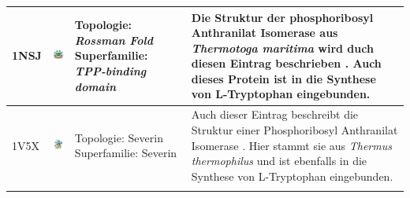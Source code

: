 \documentclass{report}
\begin{document}
\begin{table}
\begin{center}
\begin{tabular}{ | C{9mm} | C{30mm} | C{29mm} | C{38mm} | }
1NSJ  & \includegraphics[width=30mm, trim= -10 -5 -5 -10]{1NSJ_bio_r_500.jpg}  & Topologie: \newline \textit{Rossman Fold} \newline Superfamilie: \newline \textit{TPP-binding domain} & Die Struktur der phosphoribosyl Anthranilat Isomerase aus \textit{Thermotoga maritima} wird duch diesen Eintrag beschrieben \cite{1nsj}. Auch dieses Protein ist in die Synthese von L-Tryptophan eingebunden. \\ \hline
1V5X  & \includegraphics[width=30mm, trim= -10 -5 -5 -10]{1V5X_bio_r_500.jpg} & Topologie: \newline Severin \newline Superfamilie: \newline Severin & Auch dieser Eintrag beschreibt die Struktur einer Phosphoribosyl Anthranilat Isomerase \cite{1v5x}. Hier stammt sie aus \textit{Thermus thermophilus} und ist ebenfalls in die Synthese von L-Tryptophan eingebunden. \\ 
\hline

\label{tab:aldolasen1}
\end{tabular}
\end{center}
\end{table}
\end{document}
